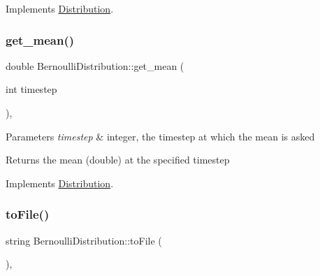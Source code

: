 Implements \mbox{\hyperlink{class_distribution_a742b398af4a461243028cce3c47d8080}{Distribution}}.

\mbox{\label{class_bernoulli_distribution_a7756a9b4861bf90bc7cc346e77b40603}} 
\subsubsection{\texorpdfstring{get\+\_\+mean()}{get\_mean()}}
{\footnotesize\ttfamily double Bernoulli\+Distribution\+::get\+\_\+mean (\begin{DoxyParamCaption}\item[{int}]{timestep }\end{DoxyParamCaption})\hspace{0.3cm}{\ttfamily [override]}, {\ttfamily [virtual]}}


\begin{DoxyParams}{Parameters}
{\em timestep} & integer, the timestep at which the mean is asked \\
\hline
\end{DoxyParams}
\begin{DoxyReturn}{Returns}
the mean (double) at the specified timestep 
\end{DoxyReturn}


Implements \mbox{\hyperlink{class_distribution_ac9c74d18549f532caa09ae86d8b25b55}{Distribution}}.

\mbox{\label{class_bernoulli_distribution_a29f9f1014234828255def7bf9872b086}} 
\subsubsection{\texorpdfstring{to\+File()}{toFile()}}
{\footnotesize\ttfamily string Bernoulli\+Distribution\+::to\+File (\begin{DoxyParamCaption}{ }\end{DoxyParamCaption})\hspace{0.3cm}{\ttfamily [override]}, {\ttfamily [virtual]}}



